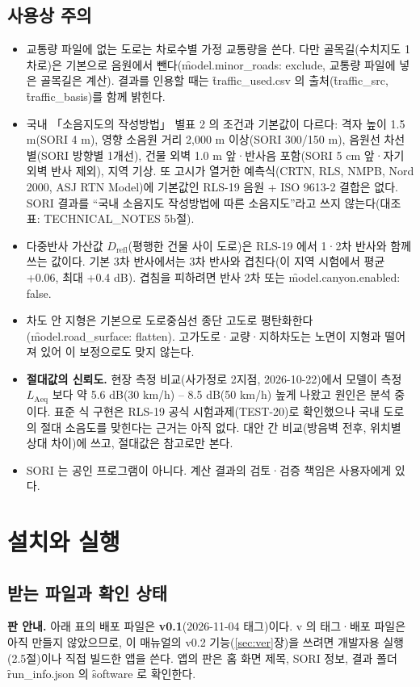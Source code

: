 \documentclass[10.5pt,a4paper]{article}
\begin{document}
\subsection{사용상 주의}
\begin{itemize}
\item 교통량 파일에 없는 도로는 차로수별 가정 교통량을 쓴다. 다만 골목길(수치지도 1차로)은 기본으로 음원에서 뺀다(\f{model.minor\_roads: exclude}, 교통량 파일에 넣은 골목길은 계산). 결과를 인용할 때는 \f{traffic\_used.csv} 의 출처(\f{traffic\_src}, \f{traffic\_basis})를 함께 밝힌다.
\item 국내 「소음지도의 작성방법」 별표 2 의 조건과 기본값이 다르다: 격자 높이 1.5 m(SORI 4 m), 영향 소음원 거리 2,000 m 이상(SORI 300/150 m), 음원선 차선별(SORI 방향별 1개선), 건물 외벽 1.0 m 앞·반사음 포함(SORI 5 cm 앞·자기 외벽 반사 제외), 지역 기상. 또 고시가 열거한 예측식(CRTN, RLS, NMPB, Nord 2000, ASJ RTN Model)에 기본값인 RLS-19 음원 + ISO 9613-2 결합은 없다. SORI 결과를 ``국내 소음지도 작성방법에 따른 소음지도''라고 쓰지 않는다(대조표: TECHNICAL\_NOTES 5b절).
\item 다중반사 가산값 $D_\mathrm{refl}$(평행한 건물 사이 도로)은 RLS-19 에서 1·2차 반사와 함께 쓰는 값이다. 기본 3차 반사에서는 3차 반사와 겹친다(이 지역 시험에서 평균 +0.06, 최대 +0.4 dB). 겹침을 피하려면 반사 2차 또는 \f{model.canyon.enabled: false}.
\item 차도 안 지형은 기본으로 도로중심선 종단 고도로 평탄화한다(\f{model.road\_surface: flatten}). 고가도로·교량·지하차도는 노면이 지형과 떨어져 있어 이 보정으로도 맞지 않는다.
\item \textbf{절대값의 신뢰도.} 현장 측정 비교(사가정로 2지점, 2026-10-22)에서 모델이 측정 $L_\mathrm{Aeq}$ 보다 약 5.6 dB(30 km/h) – 8.5 dB(50 km/h) 높게 나왔고 원인은 분석 중이다. 표준 식 구현은 RLS-19 공식 시험과제(TEST-20)로 확인했으나 국내 도로의 절대 소음도를 맞힌다는 근거는 아직 없다. 대안 간 비교(방음벽 전후, 위치별 상대 차이)에 쓰고, 절대값은 참고로만 본다.
\item SORI 는 공인 프로그램이 아니다. 계산 결과의 검토·검증 책임은 사용자에게 있다.
\end{itemize}

\section{설치와 실행}

\subsection{받는 파일과 확인 상태}
\textbf{판 안내.} 아래 표의 배포 파일은 \textbf{v0.1}(2026-11-04 태그)이다. v\soriversion{} 의 태그·배포 파일은 아직 만들지 않았으므로, 이 매뉴얼의 v0.2 기능(\ref{sec:ver}장)을 쓰려면 개발자용 실행(2.5절)이나 직접 빌드한 앱을 쓴다. 앱의 판은 홈 화면 제목, \menu SORI 정보, 결과 폴더 \f{run\_info.json} 의 \f{software} 로 확인한다.
\end{document}
